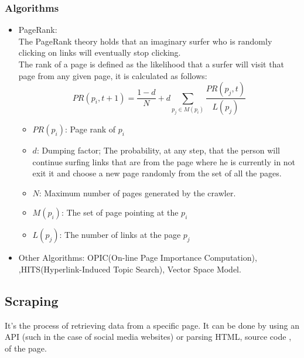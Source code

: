 \documentclass[12pt, a4paper]{report}
\begin{document}
\subsubsection{Algorithms}
\begin{itemize}
    \item PageRank:\\
    The PageRank theory holds that an imaginary surfer who is randomly clicking on links will eventually stop clicking.\\
    The rank of a page is defined as the likelihood that a surfer will visit that page from any given page, it is calculated as follows: 
$$PR(p_i,t+1)=\frac{1-d}{N}+d\sum_{p_j\in M(p_i)}\frac{PR(p_j,t)}{L(p_j)}$$
\begin{itemize}
    \item $PR(p_i)$: Page rank of $p_i$
    \item $d$: Dumping factor; The probability, at any step, that the person will continue surfing links that are from the page where he is currently in not exit it and choose a new page randomly from the set of all the pages.
    \item $N$: Maximum number of pages generated by the crawler.
    \item $M(p_i)$: The set of page pointing at the $p_i$
    \item $L(p_j)$: The number of links at the page $p_j$
\end{itemize}
    \item Other Algorithms: OPIC(On-line Page Importance Computation), ,HITS(Hyperlink-Induced Topic Search), Vector Space Model.
\end{itemize}

\subsection{Scraping}
It's the process of retrieving data from a specific page. It can be done by using an API (such in the case of social media websites) or parsing HTML, source code , of the page.
\end{document}
